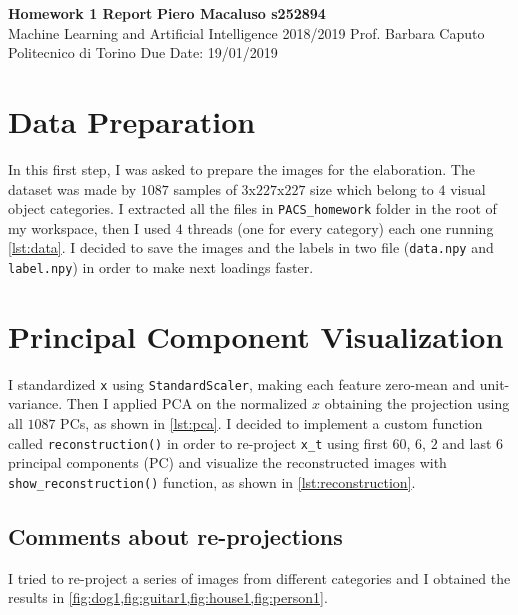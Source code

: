 \documentclass[a4paper, 11pt]{article}
\begin{document}
	\noindent
	\large\textbf{Homework 1 Report} \hfill \textbf{Piero Macaluso s252894} \\
	\normalsize Machine Learning and Artificial Intelligence 2018/2019 \hfill Prof. Barbara Caputo  \\
	\normalsize Politecnico di Torino \hfill Due Date: 19/01/2019 
	
	\section{Data Preparation}
	\showthe\columnwidth
	
	In this first step, I was asked to prepare the images for the elaboration. The dataset was made by $1087$ samples of $3$x$227$x$227$ size which belong to $4$ visual object categories.
	I extracted all the files in \texttt{PACS\_homework} folder in the root  of my workspace, then I used $4$ threads (one for every category) each one running \vref{lst:data}.
	I decided to save the images and the labels in two file (\texttt{data.npy} and \texttt{label.npy}) in order to make next loadings faster.
	
		
	\section{Principal Component Visualization}
	I standardized \texttt{x} using \texttt{StandardScaler}, making each feature zero-mean and unit-variance. Then I applied PCA on the normalized $x$ obtaining the projection using all $1087$ PCs, as shown in \vref{lst:pca}.
	I decided to implement a custom function called \texttt{reconstruction()} in order to re-project \texttt{x\_t} using first $60$, $6$, $2$ and last $6$ principal components (PC) and visualize the reconstructed images with \texttt{show\_reconstruction()} function, as shown in \vref{lst:reconstruction}.
	
	
	
	
	
	\subsection{Comments about re-projections}
	I tried to re-project a series of images from different categories and I obtained the results in \vref{fig:dog1,fig:guitar1,fig:house1,fig:person1}.
	
\end{document}
